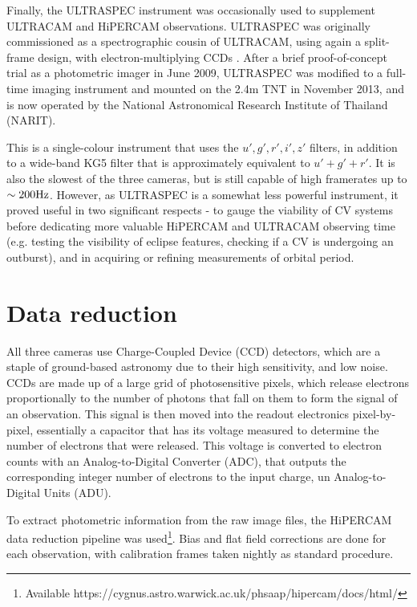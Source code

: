 Finally, the ULTRASPEC instrument was occasionally used to supplement ULTRACAM and HiPERCAM observations. ULTRASPEC was originally commissioned as a spectrographic cousin of ULTRACAM, using again a split-frame design, with electron-multiplying CCDs \citep{dhillon2014}. 
After a brief proof-of-concept trial as a photometric imager in June 2009, ULTRASPEC was modified to a full-time imaging instrument and mounted on the 2.4m TNT in November 2013, and is now operated by the National Astronomical Research Institute of Thailand (NARIT).

This is a single-colour instrument that uses the $u',g',r',i',z'$ filters, in addition to a wide-band KG5 filter that is approximately equivalent to $u' + g' + r'$. It is also the slowest of the three cameras, but is still capable of high framerates up to $\sim 200 \rm Hz$. However, as ULTRASPEC is a somewhat less powerful instrument, it proved useful in two significant respects - to gauge the viability of CV systems before dedicating more valuable HiPERCAM and ULTRACAM observing time (e.g. testing the visibility of eclipse features, checking if a CV is undergoing an outburst), and in acquiring or refining measurements of orbital period.


\section{Data reduction}
\label{sect:data reduction}

All three cameras use Charge-Coupled Device (CCD) detectors, which are a staple of ground-based astronomy due to their high sensitivity, and low noise.
CCDs are made up of a large grid of photosensitive pixels, which release electrons proportionally to the number of photons that fall on them to form the signal of an observation. This signal is then moved into the readout electronics pixel-by-pixel, essentially a capacitor that has its voltage measured to determine the number of electrons that were released. This voltage is converted to electron counts with an Analog-to-Digital Converter (ADC), that outputs the corresponding integer number of electrons to the input charge, un Analog-to-Digital Units (ADU).

To extract photometric information from the raw image files, the HiPERCAM data reduction pipeline was used\footnote{Available https://cygnus.astro.warwick.ac.uk/phsaap/hipercam/docs/html/}. 
Bias and flat field corrections are done for each observation, with calibration frames taken nightly as standard procedure.



